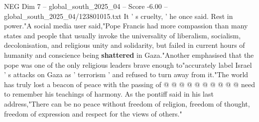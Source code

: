 \begin{textsample}{NEG Dim 7 – global\_south\_2025\_04 – Score -6.00 – global\_south\_2025\_04/123801015.txt}
It ' s cruelty, ' he once said.
Rest in power."A social media user said,"Pope Francis had more compassion than many states and people that usually invoke the universality of liberalism, socialism, decolonisation, and religious unity and solidarity, but failed in current hours of humanity and conscience being \textbf{shattered} in Gaza."Another emphasised that the pope was one of the only religious leaders brave enough to"accurately label Israel ' s attacks on Gaza as ' terrorism ' and refused to turn away from it."The world has truly lost a beacon of peace with the passing of @ @ @ @ @ @ @ @ @ @ need to remember his teachings of harmony.
As the pontiff said in his last address,"There can be no peace without freedom of religion, freedom of thought, freedom of expression and respect for the views of others."

\end{textsample}
